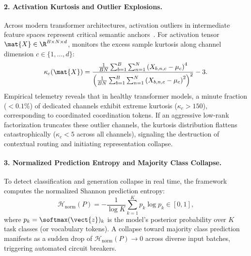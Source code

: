 \paragraph{2. Activation Kurtosis and Outlier Explosions.}
Across modern transformer architectures, activation outliers in intermediate feature spaces represent critical semantic anchors~\cite{xiao2023smoothquant,dettmers2022llmint8}. For activation tensor $\mat{X} \in \R^{B \times N \times d}$, \neuralops{} monitors the excess sample kurtosis along channel dimension $c \in \{1, \dots, d\}$:
\begin{equation}
\kappa_c(\mat{X}) = \frac{\frac{1}{B N} \sum_{b=1}^B \sum_{n=1}^N \left(X_{b,n,c} - \mu_c\right)^4}{\left(\frac{1}{B N} \sum_{b=1}^B \sum_{n=1}^N \left(X_{b,n,c} - \mu_c\right)^2\right)^2} - 3.
\end{equation}
Empirical telemetry reveals that in healthy transformer models, a minute fraction ($<0.1\%$) of dedicated channels exhibit extreme kurtosis ($\kappa_c > 150$), corresponding to coordinated coordination tokens. If an aggressive low-rank factorization truncates these outlier channels, the kurtosis distribution flattens catastrophically ($\kappa_c < 5$ across all channels), signaling the destruction of contextual routing and initiating representation collapse.

\paragraph{3. Normalized Prediction Entropy and Majority Class Collapse.}
To detect classification and generation collapse in real time, the framework computes the normalized Shannon prediction entropy:
\begin{equation}
\mathcal{H}_{\text{norm}}(P) = -\frac{1}{\log K} \sum_{k=1}^K p_k \log p_k \in [0, 1],
\end{equation}
where $p_k = \softmax(\vect{z})_k$ is the model's posterior probability over $K$ task classes (or vocabulary tokens). A collapse toward majority class prediction manifests as a sudden drop of $\mathcal{H}_{\text{norm}}(P) \to 0$ across diverse input batches, triggering automated circuit breakers.

